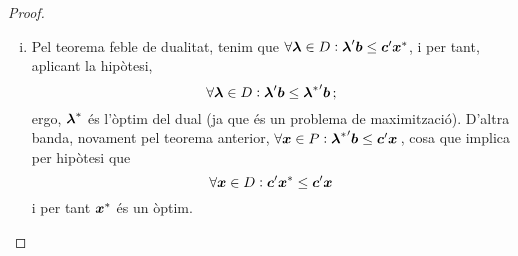 \begin{col}
\begin{proof}
\begin{enumerate}[i)]
			\item Pel teorema feble de dualitat, tenim que $\forall 
			\boldsymbol{\lambda} \in D:
			\boldsymbol{\lambda}'\boldsymbol{b} \le \boldsymbol{c}'{\boldsymbol{x}^\ast}$, i per tant, aplicant 
			la hipòtesi,
			\[\forall \boldsymbol{\lambda} \in D: \boldsymbol{\lambda} '\boldsymbol{b} \le
			{\boldsymbol{\lambda}^\ast}'\boldsymbol{b}\,;\] ergo, $\boldsymbol{\lambda}^\ast$ és 
			l'òptim del dual
			(ja que és un problema de maximització). D'altra banda, novament 
			pel teorema
			anterior, $\forall \boldsymbol{x} \in P: {\boldsymbol{\lambda}^\ast}'\boldsymbol{b} \le
			\boldsymbol{c}'\boldsymbol{x}\,$, cosa que implica per hipòtesi que \[\forall 
			\boldsymbol{x} \in D:
			\boldsymbol{c}'{\boldsymbol{x}^\ast} \le \boldsymbol{c}'\boldsymbol{x}\] i per tant $\boldsymbol{x}^\ast$ 
			és un òptim.
		\end{enumerate}
	\end{proof}
\end{col}

